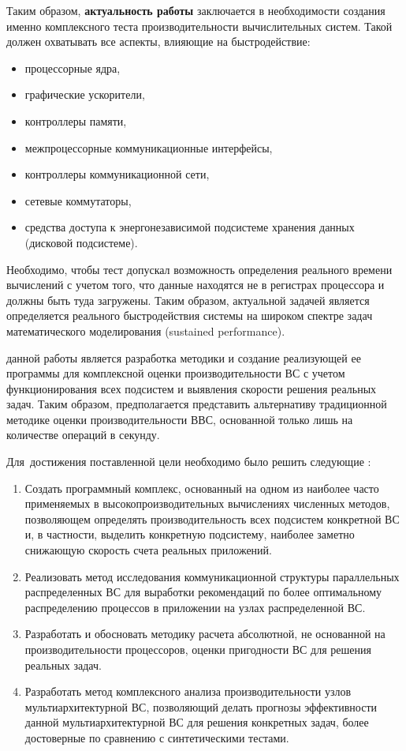 Таким образом,\textbf{ актуальность работы} заключается в необходимости создания именно комплексного теста производительности вычислительных систем. Такой должен охватывать все аспекты, влияющие на быстродействие: 
\begin{itemize}
	\item процессорные ядра, 
	\item графические ускорители, 
	\item контроллеры памяти, 
	\item межпроцессорные коммуникационные интерфейсы, 
	\item контроллеры коммуникационной сети, 
	\item сетевые коммутаторы, 
	\item средства доступа к энергонезависимой  подсистеме хранения данных (дисковой подсистеме).
\end{itemize}
Необходимо, чтобы тест допускал возможность определения  реального времени вычислений с учетом того, что данные находятся не в регистрах процессора и должны быть туда загружены. Таким образом, актуальной задачей является определяется реального быстродействия системы на широком спектре задач математического моделирования (sustained performance). 


{\aim} данной работы является разработка методики и создание реализующей ее программы для комплексной оценки производительности ВС с учетом функционирования всех подсистем  и выявления скорости решения реальных задач. Таким образом, предполагается представить альтернативу традиционной методике оценки производительности ВВС, основанной только лишь на количестве операций в секунду.  

Для~достижения поставленной цели необходимо было решить следующие {\tasks}:
\begin{enumerate}
	\item Создать программный комплекс, основанный на одном из наиболее часто применяемых в высокопроизводительных вычислениях численных методов, позволяющем определять производительность всех подсистем конкретной ВС и, в частности, выделить конкретную подсистему, наиболее заметно снижающую скорость счета реальных приложений. 
	
	\item Реализовать метод исследования коммуникационной структуры параллельных распределенных ВС для выработки рекомендаций по более оптимальному распределению процессов в приложении на узлах распределенной ВС.
	
	\item Разработать и обосновать методику расчета абсолютной, не основанной на производительности процессоров, оценки пригодности ВС для решения реальных задач. 
	
	\item Разработать метод комплексного анализа производительности узлов мультиархитектурной ВС, позволяющий делать прогнозы эффективности данной мультиархитектурной ВС для решения конкретных задач, более достоверные по сравнению с синтетическими тестами.
\end{enumerate}

